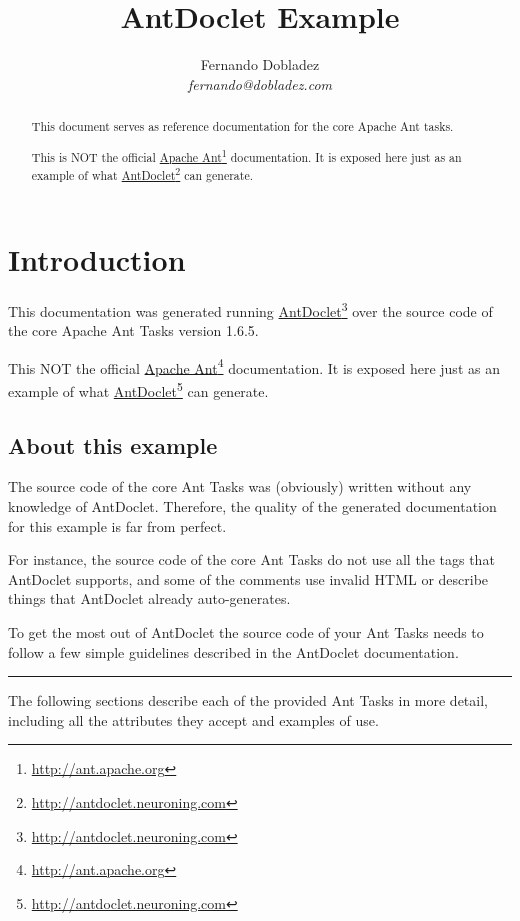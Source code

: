 \documentclass[letterpaper,11pt,oneside]{article}
\title{AntDoclet Example}
\author{Fernando Dobladez\\\smaller\slshape{}fernando@dobladez.com}
\newcommand{\webLink}[2]{\href{#2}{#1}\footnote{\href{#2}{#2}}}
\begin{document}
\maketitle %
\newpage
\begin{abstract}
This document serves as reference documentation for the core Apache Ant tasks.

This is NOT the official \webLink{Apache Ant}{http://ant.apache.org}
documentation. It is exposed here just as an example of what
\webLink{AntDoclet}{http://antdoclet.neuroning.com} can generate.

\end{abstract}

\tableofcontents
\newpage


\section{Introduction}
This documentation was generated running
\webLink{AntDoclet}{http://antdoclet.neuroning.com} over the source
code of the core Apache Ant Tasks version 1.6.5.

This NOT the official \webLink{Apache Ant}{http://ant.apache.org}
documentation. It is exposed here just as an example of what
\webLink{AntDoclet}{http://antdoclet.neuroning.com} can generate.


\subsection{About this example}
The source code of the core Ant Tasks was (obviously) written without
any knowledge of AntDoclet. Therefore, the quality of the generated
documentation for this example is far from perfect.

For instance, the source code of the core Ant Tasks do not use all the
tags that AntDoclet supports, and some of the comments use invalid
HTML or describe things that AntDoclet already auto-generates.

To get the most out of AntDoclet the source code of your Ant Tasks
needs to follow a few simple guidelines described in the AntDoclet
documentation.

\vspace{1cm}
\hrule
The following sections describe each of the provided Ant Tasks in
more detail, including all the attributes they accept and examples of
use.



\end{document}
